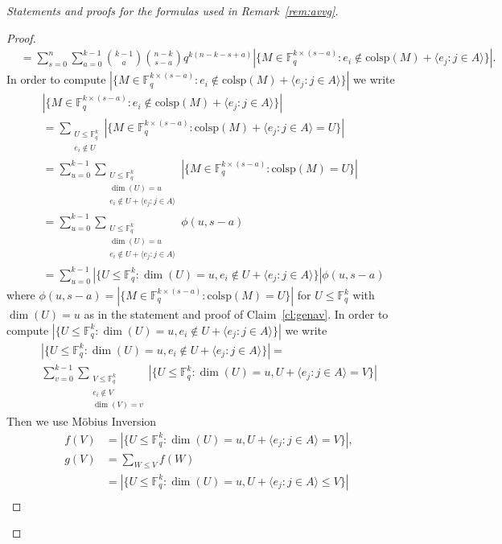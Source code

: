 \documentclass[11pt,a4paper,reqno,twoside]{amsart}
\theoremstyle{definition}
\newcommand{\F}{\mathbb{F}}
\begin{document}
\begin{appendix}
\begin{proof}[Statements and proofs for the formulas used in Remark~\ref{rem:avvg}]
\begin{proof}
\begin{align*}
&= \sum_{s=0}^{n}\sum_{a=0}^{k-1} \binom{k-1}{a} 
\binom{n-k}{s-a} q^{k(n-k-s+a)}|\{M \in \F_q^{k \times (s-a)} :e_i \notin \mbox{colsp}(M) + \langle e_j :j \in A \rangle\}|.
\end{align*}
In order to compute $|\{M \in \F_q^{k \times (s-a)} :e_i \notin \mbox{colsp}(M) + \langle e_j :j \in A \rangle\}|$ we write
\begin{align*}
    &|\{M \in \F_q^{k \times (s-a)} :e_i \notin \mbox{colsp}(M) + \langle e_j :j \in A \rangle\}| \\
    &= \sum_{\substack{U \le \F_q^k \\ e_i \notin U}}|\{M \in \F_q^{k \times (s-a)} : \mbox{colsp}(M) + \langle e_j :j \in A \rangle = U\}| \\
    &= \sum_{u=0}^{k-1}\sum_{\substack{U \le \F_q^k \\ \dim(U)=u \\ e_i \notin U+\langle e_j :j \in A \rangle}}|\{M \in \F_q^{k \times (s-a)} : \mbox{colsp}(M)  = U\}| \\
    &= \sum_{u=0}^{k-1}\sum_{\substack{U \le \F_q^k \\ \dim(U)=u \\ e_i \notin U+\langle e_j :j \in A \rangle}}\phi(u,s-a) \\
    &= \sum_{u=0}^{k-1} |\{U \le \F_q^k :\dim(U)=u, e_i \notin U+\langle e_j :j \in A \rangle\}|\phi(u,s-a) 
\end{align*}
where $\phi(u,s-a)= |\{M \in \F_q^{k \times (s-a)} : \mbox{colsp}(M)  = U\}| $ for $U \le \F_q^k$ with $\dim(U) = u$ as in the statement and proof of Claim~\ref{cl:genav}. In order to compute $|\{U \le \F_q^k :\dim(U)=u, e_i \notin U+\langle e_j :j \in A \rangle\}|$ we write
\begin{multline*}
    |\{U \le \F_q^k :\dim(U)=u, e_i \notin U+\langle e_j :j \in A \rangle\}| = \\  \sum_{v=0}^{k-1}\sum_{\substack{V \le \F_q^k \\ e_i \notin V \\ \dim(V) = v}}|\{U \le \F_q^k :\dim(U)=u, U+\langle e_j :j \in A \rangle =V \}|
\end{multline*}
Then we use Möbius Inversion
\begin{align*}
    f(V)&= |\{U \le \F_q^k :\dim(U) = u, U+\langle e_j :j \in A \rangle = V \}|, \\
    g(V)&= \sum_{W \le V} f(W) \\
    &= |\{U \le \F_q^k :\dim(U) = u, U+\langle e_j :j \in A \rangle \le V \}| \\

\end{align*}
\end{proof}
\end{proof}
\end{appendix}
\end{document}
